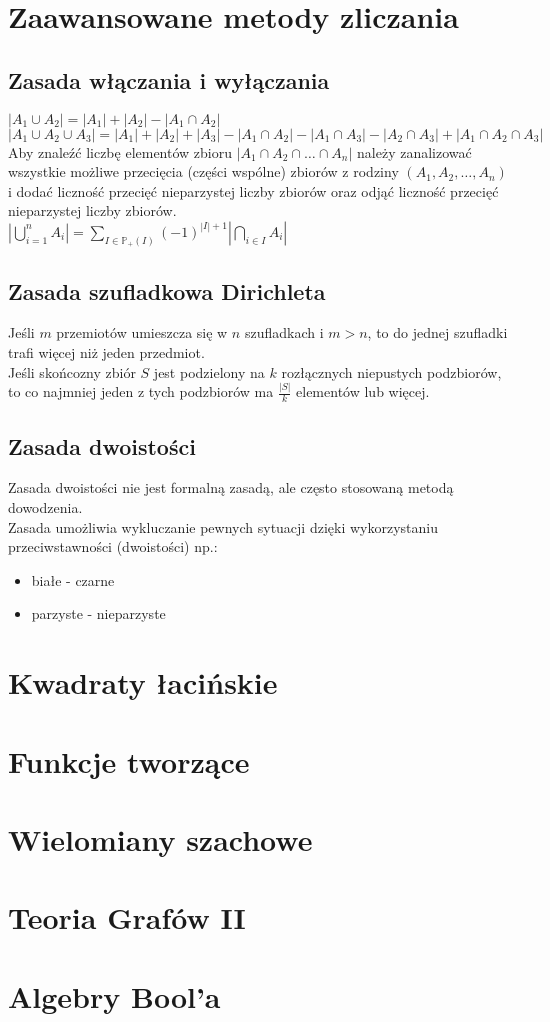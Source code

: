 \documentclass[a4paper,12pt]{article}
\begin{document}
\section{Zaawansowane metody zliczania}
\subsection{Zasada włączania i wyłączania}
	$|A_1\cup A_2| = |A_1| + |A_2| -|A_1\cap A_2|$ \\
	$|A_1\cup A_2\cup A_3| = |A_1| + |A_2| + |A_3|-|A_1\cap A_2| -|A_1\cap A_3| -|A_2\cap A_3|+ |A_1\cap A_2\cap A_3|$\\
	Aby znaleźć liczbę elementów zbioru $|A_1\cap A_2\cap \hdots \cap A_n|$ należy zanalizować wszystkie możliwe przecięcia (części wspólne) zbiorów z rodziny $(A_1, A_2, \dots ,A_n)$ i dodać liczność przecięć nieparzystej liczby zbiorów oraz odjąć liczność przecięć nieparzystej liczby zbiorów.\\
	$\left| \bigcup\limits_{i=1}^n A_i\right|=\sum\limits_{I\in\mathbb{P}_+(I)} (-1)^{|I|+1} \left| \bigcap\limits_{i\in I} A_i \right|$
\subsection{Zasada szufladkowa Dirichleta}
	Jeśli $m$ przemiotów umieszcza się w $n$ szufladkach i $m>n$, to do jednej szufladki trafi więcej niż jeden przedmiot.\\
	Jeśli skońcozny zbiór $S$ jest podzielony na $k$ rozłącznych niepustych podzbiorów, to co najmniej jeden z tych podzbiorów ma $\frac{|S|}{k}$ elementów lub więcej.
\subsection{Zasada dwoistości}
	Zasada dwoistości nie jest formalną zasadą, ale często stosowaną metodą dowodzenia.\\
	Zasada umożliwia wykluczanie pewnych sytuacji dzięki wykorzystaniu przeciwstawności (dwoistości) np.:
	\begin{itemize}
		\item białe - czarne 
		\item parzyste - nieparzyste
	\end{itemize}
\section{Kwadraty łacińskie}
\section{Funkcje tworzące}
\section{Wielomiany szachowe}
\section{Teoria Grafów II}
\section{Algebry Bool'a}
\end{document}

